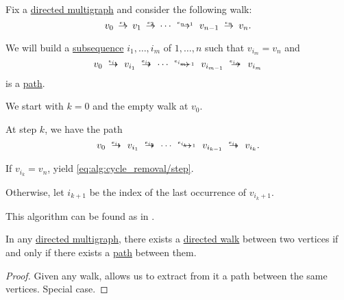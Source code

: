 \begin{algorithm}\label{alg:cycle_removal}
  Fix a \hyperref[def:hypergraph/multigraph]{directed multigraph} and consider the following walk:
  \begin{equation}\label{eq:alg:cycle_removal/src}
    v_0 \reloset {e_1} \to v_1 \reloset {e_2} \to \cdots \reloset {e_{n-1}} \to v_{n-1} \reloset {e_n} \to v_n.
  \end{equation}

  We will build a \hyperref[def:subsequence]{subsequence} \( i_1, \ldots, i_m \) of \( 1, \ldots, n \) such that \( v_{i_m} = v_n \) and
  \begin{equation}\label{eq:alg:cycle_removal/dest}
    v_0 \reloset {e_{i_1}} \to v_{i_1} \reloset {e_{i_2}} \to \cdots \reloset {e_{i_{m-1}}} \to v_{i_{m-1}} \reloset {e_{i_m}} \to v_{i_m}
  \end{equation}
  is a \hyperref[def:graph_walk/path]{path}.

  \begin{thmenum}
     We start with \( k = 0 \) and the empty walk at \( v_0 \).

     At step \( k \), we have the path
    \begin{equation}\label{eq:alg:cycle_removal/step}
      v_0 \reloset {e_{i_1}} \to v_{i_1} \reloset {e_{i_2}} \to \cdots \reloset {e_{i_{k-1}}} \to v_{i_{k-1}} \reloset {e_{i_k}} \to v_{i_k}.
    \end{equation}

    \begin{thmenum}
       If \( v_{i_k} = v_n \), yield \eqref{eq:alg:cycle_removal/step}.

       Otherwise, let \( i_{k+1} \) be the index of the last occurrence of \( v_{i_k + 1} \).
    \end{thmenum}
  \end{thmenum}
\end{algorithm}
\begin{comments}
  \item This algorithm can be found as  in \cite{code}.
\end{comments}

\begin{proposition}\label{thm:path_iff_walk}
  In any \hyperref[def:hypergraph/multigraph]{directed multigraph}, there exists a \hyperref[def:graph_walk/directed]{directed walk} between two vertices if and only if there exists a \hyperref[def:graph_walk/path]{path} between them.
\end{proposition}
\begin{proof}
  \SufficiencySubProof Given any walk,  allows us to extract from it a path between the same vertices.
  \NecessitySubProof Special case.
\end{proof}

